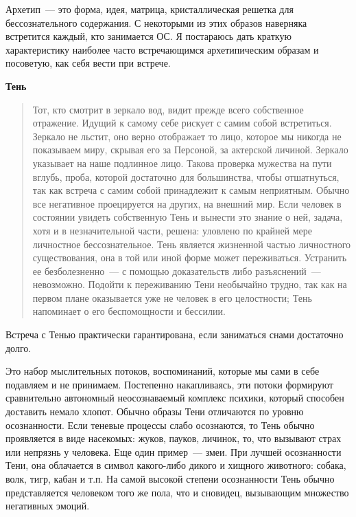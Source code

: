 \documentclass[a4paper,14pt,oneside]{memoir}
\begin{document}
Архетип~--- это форма, идея, матрица, кристаллическая решетка для бессознательного содержания. С некоторыми из этих образов наверняка встретится каждый, кто занимается ОС. Я постараюсь дать краткую характеристику наиболее часто встречающимся архетипическим образам и посоветую, как себя вести при встрече.

\begin{center}
\bfseries{Тень} 
\end{center}


\begin{quotation}
Тот, кто смотрит в зеркало вод, видит прежде всего собственное отражение. Идущий к самому себе рискует с самим собой встретиться. Зеркало не льстит, оно верно отображает то лицо, которое мы никогда не показываем миру, скрывая его за Персоной, за актерской личиной. Зеркало указывает на наше подлинное лицо. Такова проверка мужества на пути вглубь, проба, которой достаточно для большинства, чтобы отшатнуться, так как встреча с самим собой принадлежит к самым неприятным. Обычно все негативное проецируется на других, на внешний мир. Если человек в состоянии увидеть собственную Тень и вынести это знание о ней, задача, хотя и в незначительной части, решена: уловлено по крайней мере личностное бессознательное. Тень является жизненной частью личностного существования, она в той или иной форме может переживаться. Устранить ее безболезненно~--- с помощью доказательств либо разъяснений~--- невозможно. Подойти к переживанию Тени необычайно трудно, так как на первом плане оказывается уже не человек в его целостности; Тень напоминает о его беспомощности и бессилии. 
\end{quotation}


Встреча с Тенью практически гарантирована, если заниматься снами достаточно долго.

Это набор мыслительных потоков, воспоминаний, которые мы сами в себе подавляем и не принимаем. Постепенно накапливаясь, эти потоки формируют сравнительно автономный неосознаваемый комплекс психики, который способен доставить немало хлопот. Обычно образы Тени отличаются по уровню осознанности. Если теневые процессы слабо осознаются, то Тень обычно проявляется в виде насекомых: жуков, пауков, личинок, то, что вызывают страх или непрязнь у человека. Еще один пример~--- змеи. При лучшей осознанности Тени, она облачается в символ какого-либо дикого и хищного животного: собака, волк, тигр, кабан и т.п. На самой высокой степени осознанности Тень обычно представляется человеком того же пола, что и сновидец, вызывающим множество негативных эмоций.
\end{document}
